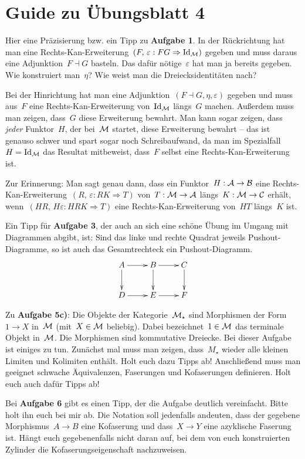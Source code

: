 \documentclass{uebblatt}
\begin{document}
\section*{Guide zu Übungsblatt 4}

Hier eine Präzisierung bzw. ein Tipp zu \textbf{Aufgabe 1}. In der Rückrichtung
hat man eine Rechts-Kan-Erweiterung~$(F,\,\varepsilon : F G \Rightarrow \mathrm{Id}_{\mathcal{M}})$
gegeben und muss daraus eine Adjunktion~$F \dashv G$ basteln. Das dafür
nötige~$\varepsilon$ hat man ja bereits gegeben. Wie konstruiert man~$\eta$?
Wie weist man die Dreiecksidentitäten nach?

Bei der Hinrichtung hat man eine Adjunktion~$(F \dashv G, \eta, \varepsilon)$
gegeben und muss aus~$F$ eine Rechts-Kan-Erweiterung von~$\mathrm{Id}_{\mathcal{M}}$ längs~$G$
machen. Außerdem muss man zeigen, dass~$G$ diese Erweiterung bewahrt. Man kann
sogar zeigen, dass \emph{jeder} Funktor~$H$, der bei~$\mathcal{M}$ startet, diese
Erweiterung bewahrt -- das ist genauso schwer und spart sogar noch
Schreibaufwand, da man im Spezialfall~$H = \mathrm{Id}_{\mathcal{M}}$ das Resultat mitbeweist,
dass~$F$ selbst eine Rechts-Kan-Erweiterung ist.

Zur Erinnerung: Man sagt genau dann, dass ein Funktor~$H : \mathcal{A} \to \mathcal{B}$ eine
Rechts-Kan-Erweiterung~$(R,\,\varepsilon : RK \Rightarrow T)$ von~$T : \mathcal{M} \to
\mathcal{A}$ längs~$K : \mathcal{M} \to \mathcal{C}$ erhält, wenn~$(HR,\,H\varepsilon : HRK \Rightarrow
T)$ eine Rechts-Kan-Erweiterung von~$HT$ längs~$K$ ist.

Ein Tipp für \textbf{Aufgabe 3}, der auch an sich eine schöne Übung im Umgang
mit Diagrammen abgibt, ist: Sind das linke und rechte Quadrat jeweils
Pushout-Diagramme, so ist auch das Gesamtrechteck ein Pushout-Diagramm.
\[ \xymatrix{
  A \ar[r]\ar[d] & B \ar[r]\ar[d] & C \ar[d] \\
  D \ar[r] & E \ar[r] & F
} \]

Zu \textbf{Aufgabe 5c)}: Die Objekte der Kategorie~$\mathcal{M}_\star$ sind Morphismen der
Form~$1 \to X$ in~$\mathcal{M}$ (mit~$X \in \mathcal{M}$ beliebig). Dabei bezeichnet~$1 \in \mathcal{M}$
das terminale Objekt in~$\mathcal{M}$. Die Morphismen sind kommutative Dreiecke.
Bei dieser Aufgabe ist einiges zu tun. Zunächst mal muss man zeigen,
dass~$M_\star$ wieder alle kleinen Limiten und Kolimiten enthält. Holt euch
dazu Tipps ab! Anschließend muss man geeignet schwache Äquivalenzen, Faserungen
und Kofaserungen definieren. Holt euch auch dafür Tipps ab!

Bei \textbf{Aufgabe 6} gibt es einen Tipp, der die Aufgabe deutlich vereinfacht.
Bitte holt ihn euch bei mir ab. Die Notation soll jedenfalls andeuten, dass der
gegebene Morphismus~$A \to B$ eine Kofaserung und dass~$X \to Y$ eine
azyklische Faserung ist. Hängt euch gegebenenfalls nicht daran auf, bei dem von
euch konstruierten Zylinder die Kofaserungseigenschaft nachzuweisen.
\end{document}
